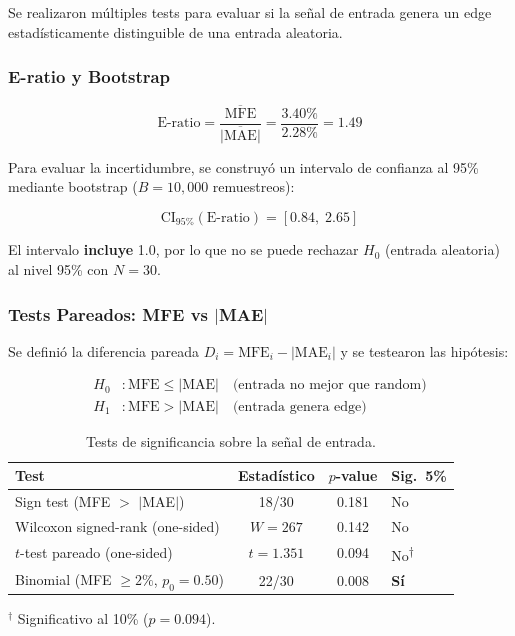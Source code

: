 \documentclass[11pt,a4paper]{article}
\begin{document}
Se realizaron m\'ultiples tests para evaluar si la se\~nal de entrada
genera un edge estad\'isticamente distinguible de una entrada aleatoria.

\subsubsection{E-ratio y Bootstrap}

\begin{equation}
\text{E-ratio} = \frac{\overline{\text{MFE}}}{\overline{|\text{MAE}|}}
= \frac{3.40\%}{2.28\%} = 1.49
\end{equation}

Para evaluar la incertidumbre, se construy\'o un intervalo de confianza
al 95\% mediante bootstrap ($B = 10{,}000$ remuestreos):

\begin{equation}
\text{CI}_{95\%}(\text{E-ratio}) = [0.84, \; 2.65]
\end{equation}

El intervalo \textbf{incluye} 1.0, por lo que no se puede rechazar
$H_0$ (entrada aleatoria) al nivel 95\% con $N=30$.

\subsubsection{Tests Pareados: MFE vs $|$MAE$|$}

Se defini\'o la diferencia pareada $D_i = \text{MFE}_i - |\text{MAE}_i|$
y se testearon las hip\'otesis:

\begin{align}
H_0&: \text{MFE} \leq |\text{MAE}| \quad \text{(entrada no mejor que random)} \\
H_1&: \text{MFE} > |\text{MAE}| \quad \text{(entrada genera edge)}
\end{align}

\begin{table}[H]
\centering
\caption{Tests de significancia sobre la se\~nal de entrada.}
\label{tab:significance}
\begin{tabular}{lccl}
\toprule
\textbf{Test} & \textbf{Estad\'istico} & \textbf{$p$-value} & \textbf{Sig.~5\%} \\
\midrule
Sign test (MFE $>$ $|$MAE$|$) & 18/30 & 0.181 & No \\
Wilcoxon signed-rank (one-sided) & $W = 267$ & 0.142 & No \\
$t$-test pareado (one-sided) & $t = 1.351$ & 0.094 & No\textsuperscript{$\dagger$} \\
Binomial (MFE $\geq 2\%$, $p_0 = 0.50$) & 22/30 & 0.008 & \textbf{S\'i} \\
\bottomrule
\end{tabular}

\vspace{4pt}
{\small $^\dagger$ Significativo al 10\% ($p = 0.094$).}
\end{table}
\end{document}

